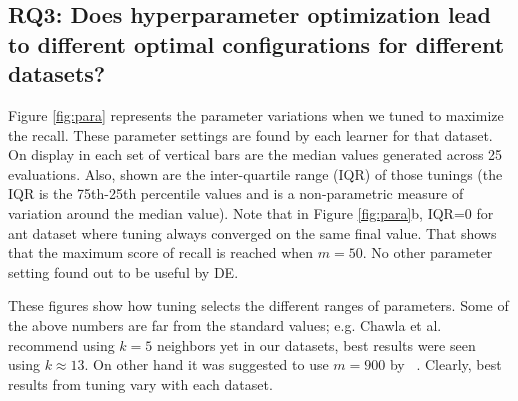\subsection{\textbf{RQ3: Does hyperparameter optimization lead to different optimal configurations for different datasets?}}

Figure \ref{fig:para} represents the parameter variations when we tuned to maximize the recall. These parameter settings are found by each learner for that dataset.
On display in each set of vertical bars are
the median values generated across 25 evaluations.
Also, shown are
the inter-quartile range (IQR) of those tunings (the IQR is the 75th-25th percentile values and is a non-parametric measure of variation
around the median value). Note that in Figure \ref{fig:para}b, IQR=0 for  ant dataset where tuning always converged on the same final value. That shows that the maximum score of recall is reached when $m=50$. No other parameter setting found out to be useful by DE.

  These figures
show how tuning selects the different ranges  of
parameters.
Some of the above numbers are far from the standard values; e.g. Chawla et al.~\cite{chawla2002smote} recommend using $k=5$ neighbors yet in our datasets, best results were seen using $k \approx 13$. On other hand it was suggested to use $m=900$ by ~\cite{pears2014synthetic}.
Clearly,
best results from tuning
vary with each dataset.


